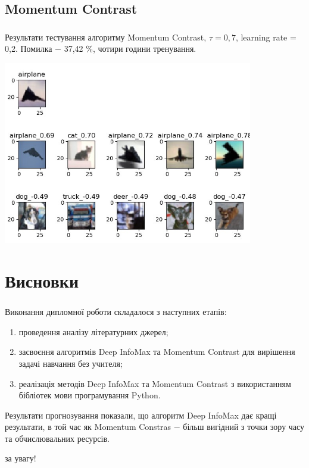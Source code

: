 \documentclass[c]{beamer}
\begin{document}
\subsection{Momentum Contrast}

\begin{frame}
	\frametitle{\insertsection}
	\framesubtitle{\insertsubsection}

	Результати тестування алгоритму Momentum Contrast, $\tau = 0,7$, learning rate = 0,2. Помилка $-$ 37,42 \%, чотири години тренування.
	
    \includegraphics[width=\textwidth, height=8cm, natwidth=621, natheight=456]{mocodemo3.jpg}

\end{frame}

\section{Висновки}

\begin{frame}
	\frametitle{\insertsection}
	Виконання дипломної роботи складалося з наступних етапів:

	\begin{enumerate}
		\item проведення аналізу літературних джерел;\pause
		\item засвоєння алгоритмів Deep InfoMax та Momentum Contrast для вирішення задачі навчання без учителя;\pause
		\item реалізація методів Deep InfoMax та Momentum Contrast з використанням бібліотек мови програмування Python.
	\end{enumerate}

	Результати прогнозування показали, що алгоритм Deep InfoMax дає кращі результати, в той час як Momentum Constras $-$ більш вигідний з точки зору часу та обчислювальних ресурсів.
\end{frame}

\begin{frame}
	\centering{} за увагу!
\end{frame}
\end{document}
